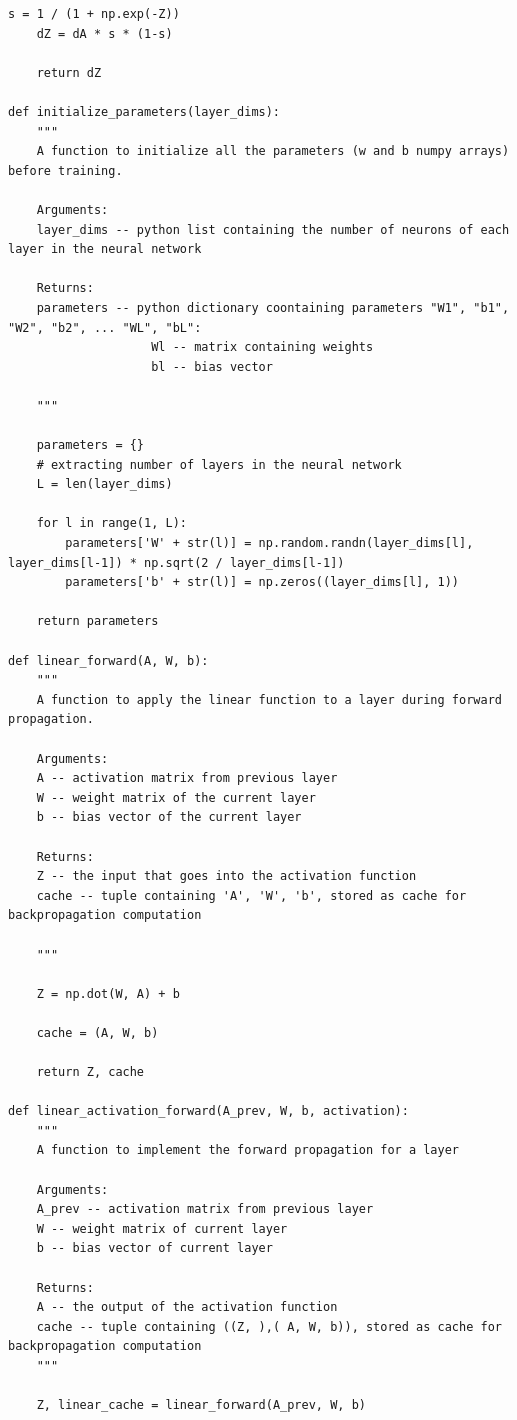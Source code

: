 \documentclass{article}
\begin{document}
\begin{lstlisting}[caption={Neural network functions - NN\_helper\_functions.py}]
    s = 1 / (1 + np.exp(-Z))
    dZ = dA * s * (1-s)

    return dZ

def initialize_parameters(layer_dims):
    """
    A function to initialize all the parameters (w and b numpy arrays) before training.

    Arguments:
    layer_dims -- python list containing the number of neurons of each layer in the neural network

    Returns:
    parameters -- python dictionary coontaining parameters "W1", "b1", "W2", "b2", ... "WL", "bL":
                    Wl -- matrix containing weights
                    bl -- bias vector

    """
    
    parameters = {}
    # extracting number of layers in the neural network
    L = len(layer_dims)

    for l in range(1, L):
        parameters['W' + str(l)] = np.random.randn(layer_dims[l], layer_dims[l-1]) * np.sqrt(2 / layer_dims[l-1])
        parameters['b' + str(l)] = np.zeros((layer_dims[l], 1))
    
    return parameters

def linear_forward(A, W, b):
    """
    A function to apply the linear function to a layer during forward propagation.

    Arguments:
    A -- activation matrix from previous layer
    W -- weight matrix of the current layer
    b -- bias vector of the current layer

    Returns:
    Z -- the input that goes into the activation function
    cache -- tuple containing 'A', 'W', 'b', stored as cache for backpropagation computation

    """

    Z = np.dot(W, A) + b

    cache = (A, W, b)
    
    return Z, cache

def linear_activation_forward(A_prev, W, b, activation):
    """
    A function to implement the forward propagation for a layer

    Arguments:
    A_prev -- activation matrix from previous layer
    W -- weight matrix of current layer
    b -- bias vector of current layer

    Returns:
    A -- the output of the activation function
    cache -- tuple containing ((Z, ),( A, W, b)), stored as cache for backpropagation computation
    """

    Z, linear_cache = linear_forward(A_prev, W, b)


\end{lstlisting}
\end{document}

